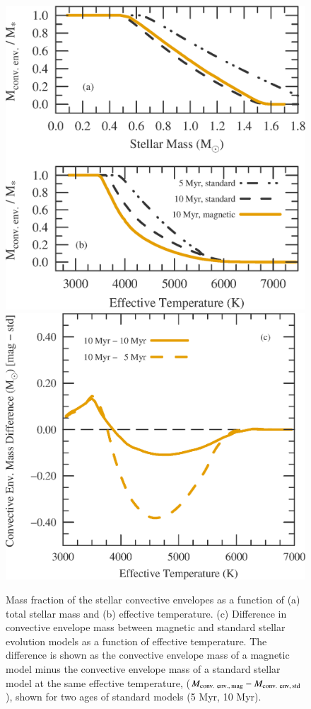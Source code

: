 \documentclass{aa}
\begin{document}
\begin{figure}[!ht]
    \centering
    \includegraphics[width=0.42\linewidth]{convective_env_masses.eps} \qquad
    \includegraphics[width=0.48\linewidth]{convective_env_mass_difference.eps}
    \caption{Mass fraction of the stellar convective envelopes as a function of (a) total stellar mass and (b) effective temperature. (c) Difference in convective envelope mass between magnetic and standard stellar evolution models as a function of effective temperature. The difference is shown as the convective envelope mass of a magnetic model minus the convective envelope mass of a standard stellar model at the same effective temperature, ($M_{\rm conv.\ env.,\, mag} - M_{\rm conv.\ env,\, std}$), shown for two ages of standard models (5 Myr, 10 Myr).}
    \label{fig:rad_core}
\end{figure}
\end{document}
